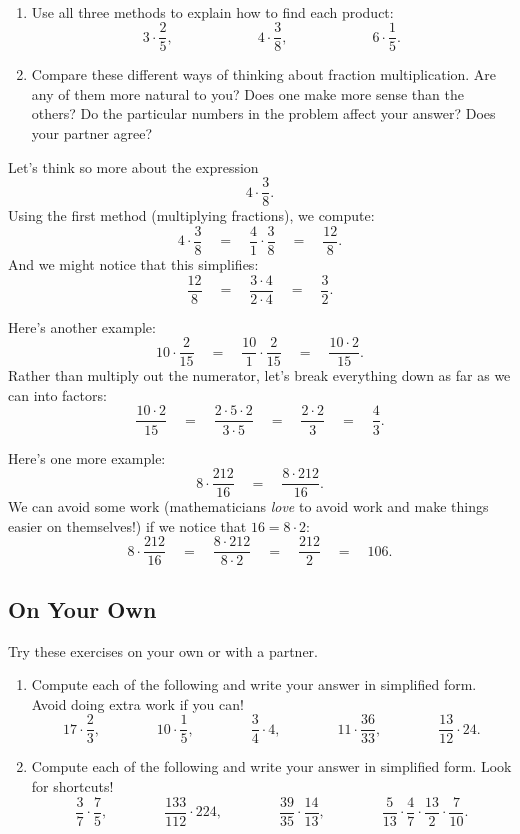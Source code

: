 \begin{thinkpair*}\ 
\begin{enumerate}
\item
Use all three methods to explain how to find each product:
\[
3 \cdot \frac 2 5 ,
\qquad\qquad\qquad
4 \cdot \frac 3 8 ,
\qquad\qquad\qquad
6 \cdot \frac 1 5.
\]

\item
Compare these different ways of thinking about fraction multiplication.  Are any of them more natural to you?  Does one make more sense than the others?  Do the particular numbers in the problem affect your answer?  Does your partner agree?
\end{enumerate}
\end{thinkpair*}


Let's think so more about the expression 
\[
4 \cdot \frac 38.
\]
Using the first method (multiplying fractions), we compute:
\[
4 \cdot \frac 38 
\quad
=
\quad
 \frac 41 \cdot \frac 38
 \quad
  = 
  \quad
  \frac{12}8.
\]
And we might notice that this simplifies:
\[
\frac{12}8 
\quad
=
\quad
 \frac{3\cdot 4}{2\cdot 4} 
 \quad
 = 
 \quad
 \frac 32.
\]

Here's another example:
\[
10 \cdot \frac 2{15} 
\quad
=
\quad
 \frac{10} 1 \cdot \frac 2{15} 
\quad
= 
\quad
\frac{10\cdot 2}{15}.
\]
Rather than multiply out the numerator, let's break everything down as far as we can into factors:
\[
 \frac{10\cdot 2}{15} 
 \quad
=
\quad
\frac{2\cdot 5 \cdot 2}{3\cdot 5}
\quad
=
\quad
 \frac{2\cdot2}{3} 
 \quad
=
\quad
\frac{4}{3}.
\]



Here's one more example:
\[
8 \cdot \frac{212}{16} 
\quad
= 
\quad
\frac{8 \cdot 212}{16}.
\]
We can avoid some work (mathematicians \emph{love} to avoid work and make things easier on themselves!) if we notice that $16 = 8 \cdot 2$:
\[
8 \cdot \frac{212}{16} 
\quad
=
\quad
 \frac{8 \cdot 212}{8\cdot 2} 
 \quad
 =
 \quad
  \frac{212}{2}
  \quad
   = 
   \quad
   106.
\]

\subsection*{On Your Own}
Try these exercises on your own or with a partner.

\begin{enumerate}
\item
Compute each of the following and write your answer in simplified form.  Avoid doing extra work if you can!
\[
17 \cdot \frac 2 3,
\qquad\qquad
10 \cdot \frac 1 5 ,
\qquad\qquad
\frac 3 4 \cdot 4,
\qquad\qquad
11 \cdot \frac{36}{33},
\qquad\qquad
\frac{13}{12} \cdot 24.
\]

\item
Compute each of the following and write your answer in simplified form.  Look for shortcuts!
\[
\frac 3 7 \cdot \frac 7 5,
\qquad\qquad
\frac{133}{112} \cdot 224,
\qquad\qquad
\frac{39}{35}\cdot\frac{14}{13},
\qquad\qquad
\frac 5{13} \cdot \frac 47 \cdot \frac{13}2  \cdot \frac 7{10}.
\]
\end{enumerate}

